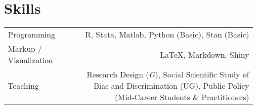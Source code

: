 \section*{Skills}
\begin{tabular}{L!{\VRule}R}
Programming &   R, Stata, Matlab, Python (Basic), Stan (Basic)   \\ [3pt]
Markup / Visualization & \LaTeX, Markdown,  Shiny  \\[3pt]
 Teaching
& Research Design (\textit{G}), Social Scientific Study of Bias and Discrimination (UG), Public Policy (Mid-Career Students \& Practitioners) \\
\end{tabular}
